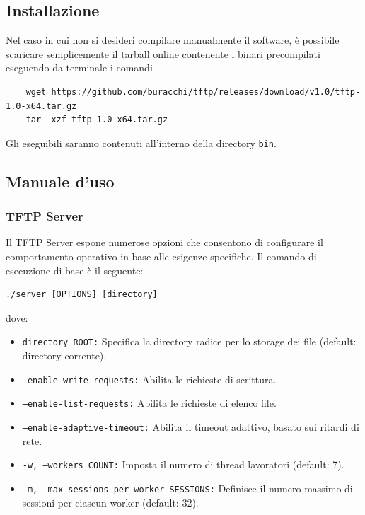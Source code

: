 \documentclass[12pt]{article}
\begin{document}
{\pagebreak
\subsection{Installazione}

Nel caso in cui non si desideri compilare manualmente il software, è possibile scaricare semplicemente il tarball online contenente i binari precompilati eseguendo da terminale i comandi
\begin{verbatim}
    wget https://github.com/buracchi/tftp/releases/download/v1.0/tftp-1.0-x64.tar.gz
    tar -xzf tftp-1.0-x64.tar.gz
\end{verbatim}
Gli eseguibili saranno contenuti all'interno della directory \texttt{bin}.

\subsection{Manuale d'uso}

\subsubsection{TFTP Server}

Il TFTP Server espone numerose opzioni che consentono di configurare il comportamento operativo in base alle esigenze specifiche. Il comando di esecuzione di base è il seguente:
\begin{verbatim}
./server [OPTIONS] [directory]
\end{verbatim}
dove:
\begin{itemize}
    \item \texttt{directory ROOT:} Specifica la directory radice per lo storage dei file (default: directory corrente).
    \item \texttt{--enable-write-requests:} Abilita le richieste di scrittura.
    \item \texttt{--enable-list-requests:} Abilita le richieste di elenco file.
    \item \texttt{--enable-adaptive-timeout:} Abilita il timeout adattivo, basato sui ritardi di rete.
    \item \texttt{-w, --workers COUNT:} Imposta il numero di thread lavoratori (default: 7).
    \item \texttt{-m, --max-sessions-per-worker SESSIONS:} Definisce il numero massimo di sessioni per ciascun worker (default: 32).
\end{itemize}

}
\end{document}
